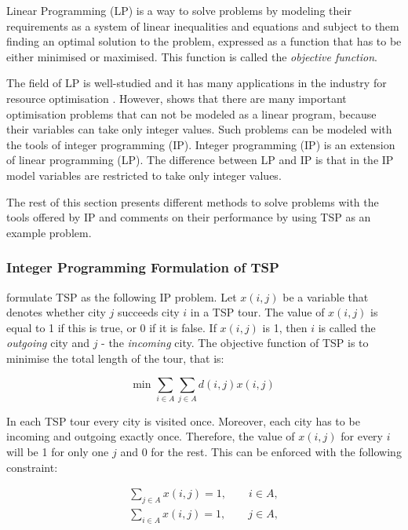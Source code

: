 \documentclass{mprop}
\theoremstyle{definition}
\begin{document}
Linear Programming (LP) is a way to solve problems by modeling their requirements as a system of linear inequalities and equations and subject to them finding an optimal solution to the problem, expressed as a function that has to be either minimised or maximised. This function is called the \textit{objective function}.

The field of LP is well-studied \citep{Kantorovich60,DantzigLp63} and it has many applications in the industry for resource optimisation \citep{Jacovkis89,Garvin57}. However, \citet{Dantzig60} shows that there are many important optimisation problems that can not be modeled as a linear program, because their variables can take only integer values. Such problems can be modeled with the tools of integer programming (IP). Integer programming (IP) is an extension of linear programming (LP). The difference between LP and IP is that in the IP model variables are restricted to take only integer values.

The rest of this section presents different methods to solve problems with the tools offered by IP and comments on their performance by using TSP as an example problem.

\subsubsection{Integer Programming Formulation of TSP}
\label{sec:iptspformulation}

\citet{Dantzig54} formulate TSP as the following IP problem. Let $x(i,j)$ be a variable that denotes whether city $j$ succeeds city $i$ in a TSP tour. The value of $x(i,j)$ is equal to 1 if this is true, or 0 if it is false. If $x(i,j)$ is 1, then $i$ is called the \textit{outgoing} city and $j$ - the \textit{incoming} city. The objective function of TSP is to minimise the total length of the tour, that is:

\begin{equation}
\label{eq:objfunc}
\textrm{min } \sum_{i\in A}\sum_{j\in A} d(i,j)x(i,j)
\end{equation}

In each TSP tour every city is visited once. Moreover, each city has to be incoming and outgoing exactly once. Therefore, the value of $x(i,j)$ for every $i$ will be 1 for only one $j$ and 0 for the rest. This can be enforced with the following constraint:

\begin{equation}
\label{eq:one}
\begin{split}
  \sum_{j \in A} x(i,j) = 1, \qquad i \in A,\\
  \sum_{i \in A} x(i,j) = 1, \qquad j \in A,
\end{split}
\end{equation}
\end{document}
